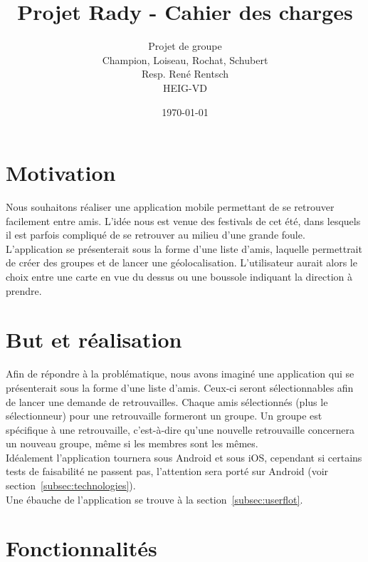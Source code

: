 \documentclass[french]{article}
\begin{document}
	
	\title{Projet Rady - Cahier des charges}
	\author{Projet de groupe\\
		Champion, Loiseau, Rochat, Schubert\\
		Resp. René Rentsch\\
		HEIG-VD}
	\date{\today}
	\maketitle
	
	\tableofcontents
	
	\justify
	
	\section{Motivation}
		 Nous souhaitons réaliser une application mobile permettant de se retrouver facilement entre amis. L’idée nous est venue des festivals de cet été, dans lesquels il est parfois compliqué de se retrouver au milieu d’une grande foule. L’application se présenterait sous la forme d’une liste d’amis, laquelle permettrait de créer des groupes et de lancer une géolocalisation. L’utilisateur aurait alors le choix entre une carte en vue du dessus ou une boussole indiquant la direction à
		 prendre.
	
	\section{But et réalisation}
		Afin de répondre à la problématique, nous avons imaginé une application qui se présenterait sous la forme d'une liste d'amis. Ceux-ci seront sélectionnables afin de lancer une demande de retrouvailles. Chaque amis sélectionnés (plus le sélectionneur) pour une retrouvaille formeront un groupe. Un groupe est spécifique à une retrouvaille, c'est-à-dire qu'une nouvelle retrouvaille concernera un nouveau groupe, même si les membres sont les mêmes.\\
		
		Idéalement l'application tournera sous Android et sous iOS, cependant si certains tests de faisabilité ne passent pas, l'attention sera porté sur Android (voir section~\ref{subsec:technologies}).\\
		
		Une ébauche de l'application se trouve à la section~\ref{subsec:userflot}.
	
	\section{Fonctionnalités}
\end{document}
